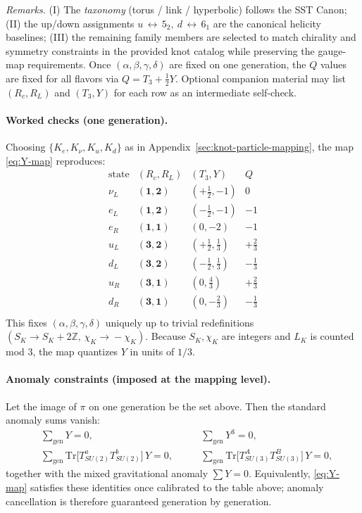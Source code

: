 \documentclass[smallextended]{svjour3}       %
\begin{document}
\noindent\textit{Remarks.} (I) The \emph{taxonomy} (torus / link / hyperbolic) follows the SST Canon; (II) the up/down assignments \(u\,\leftrightarrow\,5_2,\ d\,\leftrightarrow\,6_1\) are the canonical helicity baselines; (III) the remaining family members are selected to match chirality and symmetry constraints in the provided knot catalog while preserving the gauge-map requirements. Once \((\alpha,\beta,\gamma,\delta)\) are fixed on one generation, the \(Q\) values are fixed for all flavors via \(Q=T_3+\tfrac12Y\). Optional companion material may list \((R_c,R_L)\) and \((T_3,Y)\) for each row as an intermediate self-check.


\paragraph{Worked checks (one generation).}
	Choosing \(\{K_e,K_\nu,K_u,K_d\}\) as in Appendix~\ref{sec:knot-particle-mapping}, the map \eqref{eq:Y-map} reproduces:
	\[
		\begin{array}{c|c|c|c}
			\text{state} & (R_c,R_L) & (T_3,Y) & Q \\
			\hline
			\nu_L & (\mathbf{1},\mathbf{2}) & (+\tfrac{1}{2},-1) & 0 \\
			e_L  & (\mathbf{1},\mathbf{2}) & (-\tfrac{1}{2},-1) & -1 \\
			e_R  & (\mathbf{1},\mathbf{1}) & (0,-2) & -1 \\
			u_L  & (\mathbf{3},\mathbf{2}) & (+\tfrac{1}{2},\tfrac{1}{3}) & +\tfrac{2}{3} \\
			d_L  & (\mathbf{3},\mathbf{2}) & (-\tfrac{1}{2},\tfrac{1}{3}) & -\tfrac{1}{3} \\
			u_R  & (\mathbf{3},\mathbf{1}) & (0,\tfrac{4}{3}) & +\tfrac{2}{3} \\
			d_R  & (\mathbf{3},\mathbf{1}) & (0,-\tfrac{2}{3}) & -\tfrac{1}{3} \\
		\end{array}
	\]
	This fixes \((\alpha,\beta,\gamma,\delta)\) uniquely up to trivial redefinitions \((S_K\!\to\!S_K+2\mathbb{Z},\,\chi_K\!\to\!-\chi_K)\).
	Because \(S_K,\chi_K\) are integers and \(L_K\) is counted mod \(3\), the map quantizes \(Y\) in units of \(1/3\).

	\paragraph{Anomaly constraints (imposed at the mapping level).}
	Let the image of \(\pi\) on one generation be the set above.
	Then the standard anomaly sums vanish:
    \begin{align}
		&\sum_{\text{gen}} Y = 0,\qquad
		&\sum_{\text{gen}} Y^3 = 0,\\
		&\sum_{\text{gen}} \mathrm{Tr}\big[T^a_{SU(2)}T^b_{SU(2)}\big]\,Y=0,\qquad
		&\sum_{\text{gen}} \mathrm{Tr}\big[T^A_{SU(3)}T^B_{SU(3)}\big]\,Y=0,
    \end{align}
	together with the mixed gravitational anomaly \(\sum Y=0\).
	Equivalently, \eqref{eq:Y-map} satisfies these identities once calibrated to the table above; anomaly cancellation is therefore guaranteed generation by generation.
\end{document}
